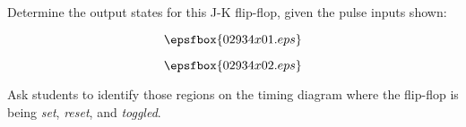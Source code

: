 

Determine the output states for this J-K flip-flop, given the pulse inputs shown:

$$\epsfbox{02934x01.eps}$$







$$\epsfbox{02934x02.eps}$$







Ask students to identify those regions on the timing diagram where the flip-flop is being {\it set}, {\it reset}, and {\it toggled}.




